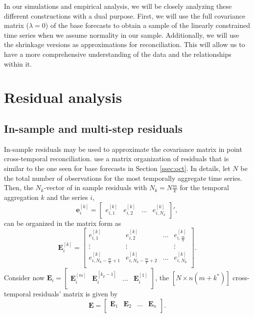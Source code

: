 \documentclass[a4paper,11pt]{article}
\newcommand{\evet}{\bm{e}}
\newcommand{\Evet}{\bm{E}}
\theoremstyle{definition}
\begin{document}
In our simulations and empirical analysis, we will be closely analyzing these different constructions with a dual purpose. First, we will use the full covariance matrix ($\lambda = 0$) of the base forecasts to obtain a sample of the linearly constrained time series when we assume normality in our sample. Additionally, we will use the shrinkage versions as approximations for reconciliation. This will allow us to have a more comprehensive understanding of the data and the relationships within it.


\section{Residual analysis}\label{sec:res}

\subsection{In-sample and multi-step residuals} \label{ssec:multi_res}

In-sample residuals may be used to approximate the covariance matrix in point cross-temporal reconciliation. \cite{difonzo2023} use a matrix organization of residuals that is similar to the one seen for base forecasts in Section \ref{ssec:oct}. In details, let $N$ be the total number of observations for the most temporally aggregate time series. Then, the $N_k$-vector of in sample residuals with $N_k = N\frac{m}{k}$ for the temporal aggregation $k$ and the series $i$,
$$
\evet_i^{[k]} = \begin{bmatrix}
	e_{i,1}^{[k]} & e_{i,2}^{[k]} & \dots & e_{i,N_k}^{[k]}
\end{bmatrix}',
$$
can be organized in the matrix form as
\begin{equation}\label{eq:Evetki}
	\Evet_i^{[k]} = \begin{bmatrix}
	e_{i,1}^{[k]} & e_{i,2}^{[k]} & \dots & e_{i,\frac{m}{k}}^{[k]} \\
	\vdots & \vdots & & \vdots \\
	e_{i,N_k - \frac{m}{k} + 1}^{[k]} & e_{i,N_k - \frac{m}{k} + 2}^{[k]} & \dots & e_{i,N_k}^{[k]} \\
\end{bmatrix}.
\end{equation}
Consider now $\Evet_i = \begin{bmatrix}
	\Evet_i^{[m]} & \Evet_i^{[k_p-1]} & \dots & \Evet_i^{[1]}\\
\end{bmatrix}$, the $[N \times n(m+k^\ast)]$ cross-temporal residuals' matrix is given by
\begin{equation}
\label{eq:Emat}
\Evet = \begin{bmatrix}
	\Evet_1 & \Evet_2 & \dots & \Evet_n\\
\end{bmatrix}.
\end{equation}
\end{document}
